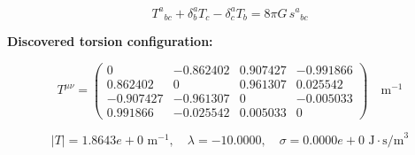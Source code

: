 
\begin{equation}
  T^a{}_{bc} + \delta^a_b T_c - \delta^a_c T_b = 8\pi G \, s^a{}_{bc}
\end{equation}

\textbf{Discovered torsion configuration:}

\begin{equation}
  T^{\mu\nu} = \begin{pmatrix}
    0 & -0.862402 & 0.907427 & -0.991866 \\
    0.862402 & 0 & 0.961307 & 0.025542 \\
    -0.907427 & -0.961307 & 0 & -0.005033 \\
    0.991866 & -0.025542 & 0.005033 & 0
  \end{pmatrix} \quad \text{m}^{-1}
\end{equation}

\begin{equation}
  |T| = 1.8643e+0 \text{ m}^{-1}, \quad
  \lambda = -10.0000, \quad
  \sigma = 0.0000e+0 \text{ J}\cdot\text{s/m}^3
\end{equation}